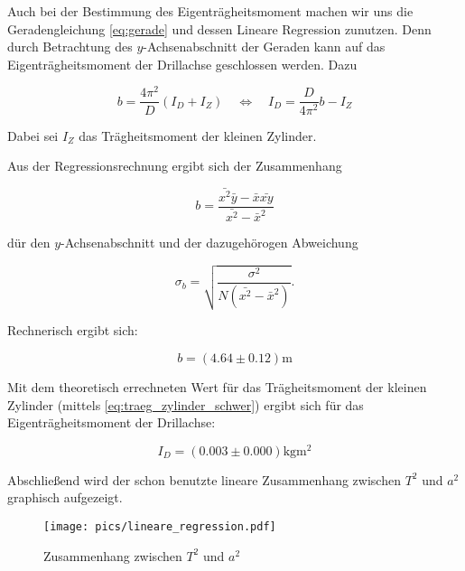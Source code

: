 Auch bei der Bestimmung des Eigenträgheitsmoment machen wir uns die 
Geradengleichung \eqref{eq:gerade} und dessen Lineare Regression zunutzen.
Denn durch Betrachtung des $y$-Achsenabschnitt der Geraden kann auf das Eigenträgheitsmoment der Drillachse geschlossen werden.
Dazu

\begin{equation*}
b=\frac{4\pi^2}{D}\left(I_D+I_Z\right) \quad \Leftrightarrow \quad I_D=\frac{D}{4\pi^2}b-I_Z
\end{equation*}

Dabei sei $I_Z$ das Trägheitsmoment der kleinen Zylinder.

Aus der Regressionsrechnung ergibt sich der Zusammenhang

\begin{equation*}
b=\frac{\bar{x^2}\bar{y}-\bar{x}\bar{xy}}{\bar{x^2}-\bar{x}^2}
\end{equation*}

dür den $y$-Achsenabschnitt und der dazugehörogen Abweichung

\begin{equation*}
\sigma_b=\sqrt{\frac{\sigma^2}{N\left(\bar{x^2}-\bar{x}^2\right)}}.
\end{equation*}

Rechnerisch ergibt sich:

\begin{equation}
\label{eq:y_achsenabschnitt}
b=\left(\num{4.64}\pm\num{0.12}\right) \si{\meter}
\end{equation}

Mit dem theoretisch errechneten Wert für das Trägheitsmoment der kleinen Zylinder (mittels \eqref{eq:traeg_zylinder_schwer}) ergibt sich für das 
Eigenträgheitsmoment der Drillachse:

\begin{equation}
\label{eq:eigentraegheitsmoment}
I_D=\left(\num{0.003}\pm\num{0.000}\right) \si{\kilogram\meter\squared}
\end{equation}


Abschließend wird der schon benutzte lineare Zusammenhang zwischen $T^2$ und $a^2$ graphisch aufgezeigt.

\begin{figure}
  \centering
  \texttt{[image: pics/lineare\_regression.pdf]}
  \caption{Zusammenhang zwischen $T^2$ und $a^2$}
  \label{fig:zusammenhang_a_T}
\end{figure}


